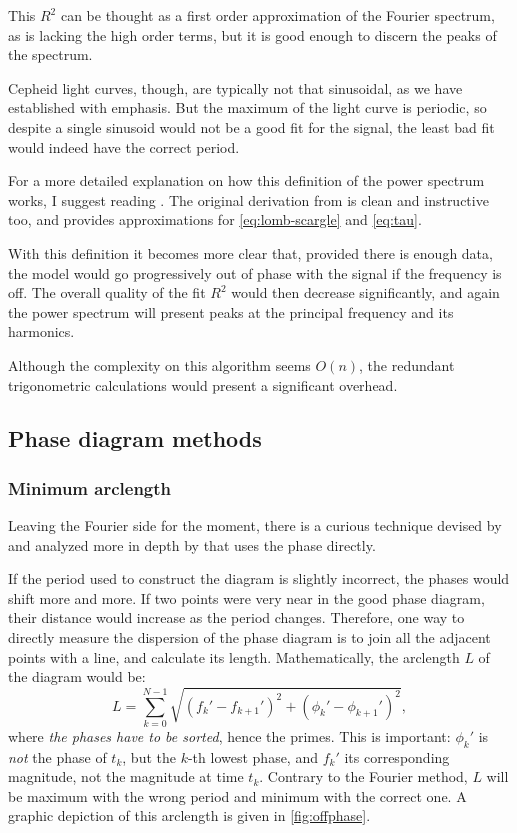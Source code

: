 	This $R^2$ can be thought as a first order approximation of the Fourier spectrum, as is lacking the high order terms,
	but it is good enough to discern the peaks of the spectrum.
	
	Cepheid light curves, though, are typically not that sinusoidal, as we have established with emphasis.
	But the maximum of the light curve is periodic, so despite a single sinusoid would not be a good fit for the signal,
	the least bad fit would indeed have the correct period.
	
	For a more detailed explanation on how this definition of the power spectrum works, I suggest reading \cite{Vanderplas2018}.
	The original derivation from \cite{Lomb1976} is clean and instructive too, and provides approximations for \autoref{eq:lomb-scargle} and \autoref{eq:tau}.
	
	With this definition it becomes more clear that, provided there is enough data, 
	the model would go progressively out of phase with the signal if the frequency is off.
	The overall quality of the fit $R^2$ would then decrease significantly, 
	and again the power spectrum will present peaks at the principal frequency and its harmonics.

	Although the complexity on this algorithm seems $O(n)$, the redundant trigonometric calculations would present a significant overhead.

\subsection{Phase diagram methods \label{sec:phase-diagram-methods}}

	\subsubsection{Minimum arclength}
	
	Leaving the Fourier side for the moment, there is a curious technique devised by \cite{Burke1970} 
	and analyzed more in depth by \cite{Dworetsky1983} that uses the phase directly.
	
	If the period used to construct the diagram is slightly incorrect, the phases would shift more and more.
	If two points were very near in the good phase diagram, their distance would increase as the period changes.
	Therefore, one way to directly measure the dispersion of the phase diagram is to join all the adjacent points with a line, and calculate its length.
	Mathematically, the arclength $L$ of the diagram would be:
	\begin{equation}
		L = \sum_{k=0}^{N-1} \sqrt{(f_k'-f_{k+1}')^2+(\phi_k'-\phi_{k+1}')^2}, \label{eq:arclength}
	\end{equation}
	where \textit{the phases have to be sorted}, hence the primes. This is important: $\phi_k'$ is \textit{not} the phase of $t_k$, but the $k$-th lowest phase, 
	and $f_k'$ its corresponding magnitude, not the magnitude at time $t_k$.
	Contrary to the Fourier method, $L$ will be maximum with the wrong period and minimum with the correct one.
	A graphic depiction of this arclength is given in \autoref{fig:offphase}.
	
